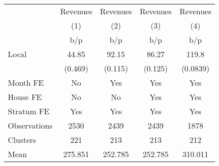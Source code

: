 {
\def\sym#1{\ifmmode^{#1}\else\(^{#1}\)\fi}
\begin{tabular}{l*{4}{c}}
\toprule
                &\multicolumn{1}{c}{Revenues}&\multicolumn{1}{c}{Revenues}&\multicolumn{1}{c}{Revenues}&\multicolumn{1}{c}{Revenues}\\
                &\multicolumn{1}{c}{(1)}&\multicolumn{1}{c}{(2)}&\multicolumn{1}{c}{(3)}&\multicolumn{1}{c}{(4)}\\
                &      b/p&      b/p&      b/p&      b/p\\
\midrule
Local           &    44.85&    92.15&    86.27&    119.8\\
                &  (0.469)&  (0.115)&  (0.125)& (0.0839)\\
Month FE        &       No&      Yes&      Yes&      Yes\\
House FE        &       No&       No&      Yes&      Yes\\
Stratum FE      &      Yes&      Yes&      Yes&      Yes\\
\midrule
Observations    &     2530&     2439&     2439&     1878\\
Clusters        &      221&      213&      213&      212\\
Mean            &  275.851&  252.785&  252.785&  310.011\\
\bottomrule
\end{tabular}
}
